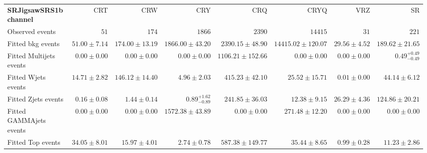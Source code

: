 

\begin{table}
\begin{center}
\setlength{\tabcolsep}{0.0pc}
{\tiny
\begin{tabular*}{\textwidth}{@{\extracolsep{\fill}}lrrrrrrr}
\noalign{\smallskip}\hline\noalign{\smallskip}
{\bf SRJigsawSRS1b channel}           & CRT            & CRW            & CRY            & CRQ            & CRYQ            & VRZ            & SR              \\[-0.05cm]
\noalign{\smallskip}\hline\noalign{\smallskip}
Observed events          & $51$              & $174$              & $1866$              & $2390$              & $14415$              & $31$              & $221$                    \\
\noalign{\smallskip}\hline\noalign{\smallskip}
Fitted bkg events         & $51.00 \pm 7.14$          & $174.00 \pm 13.19$          & $1866.00 \pm 43.20$          & $2390.15 \pm 48.90$          & $14415.02 \pm 120.07$          & $29.56 \pm 4.52$          & $189.62 \pm 21.65$              \\
\noalign{\smallskip}\hline\noalign{\smallskip}
        Fitted Multijets events         & $0.00 \pm 0.00$          & $0.00 \pm 0.00$          & $0.00 \pm 0.00$          & $1106.21 \pm 152.66$          & $0.00 \pm 0.00$          & $0.00 \pm 0.00$          & $0.49_{-0.49}^{+0.49}$              \\
        Fitted Wjets events         & $14.71 \pm 2.82$          & $146.12 \pm 14.40$          & $4.96 \pm 2.03$          & $415.23 \pm 42.10$          & $25.52 \pm 15.71$          & $0.01 \pm 0.00$          & $44.14 \pm 6.12$              \\
        Fitted Zjets events         & $0.16 \pm 0.08$          & $1.44 \pm 0.14$          & $0.89_{-0.89}^{+1.62}$          & $241.85 \pm 36.03$          & $12.38 \pm 9.15$          & $26.29 \pm 4.36$          & $124.86 \pm 20.21$              \\
        Fitted GAMMAjets events         & $0.00 \pm 0.00$          & $0.00 \pm 0.00$          & $1572.38 \pm 43.89$          & $0.00 \pm 0.00$          & $271.48 \pm 12.20$          & $0.00 \pm 0.00$          & $0.00 \pm 0.00$              \\
        Fitted Top events         & $34.05 \pm 8.01$          & $15.97 \pm 4.01$          & $2.74 \pm 0.78$          & $587.38 \pm 149.77$          & $35.44 \pm 8.65$          & $0.99 \pm 0.28$          & $11.23 \pm 2.86$              \\

\end{tabular*}}
\end{center}
\end{table}
